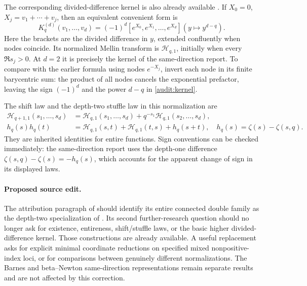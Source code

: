\documentclass[11pt,a4paper]{article}
\numberwithin{equation}{section}
\theoremstyle{plain}
\theoremstyle{definition}
\theoremstyle{remark}
\begin{document}
The corresponding divided-difference kernel is also already available
\cite{INY,HarmonicGaps}.  If $X_0=0$, $X_j=v_1+\cdots+v_j$, then an
equivalent convenient form is
\begin{equation}\label{audit:kernel}
 K_q^{(d)}(v_1,\ldots,v_d)
   =(-1)^d[e^{X_0},e^{X_1},\ldots,e^{X_d}]
                         (y\mapsto y^{d-q}).
\end{equation}
Here the brackets are the divided difference in $y$, extended
confluently when nodes coincide.  Its normalized Mellin transform is
$\mathcal H_{q,1}$, initially when every $\Re s_j>0$.
At $d=2$ it is precisely the kernel of the same-direction report.
To compare with the earlier formula using nodes $e^{-X_j}$, invert
each node in its finite barycentric sum: the product of all nodes
cancels the exponential prefactor, leaving the sign $(-1)^d$ and
the power $d-q$ in \eqref{audit:kernel}.

The shift law and the depth-two stuffle law in this normalization are
\begin{align}
 \mathcal H_{q+1,1}(s_1,\ldots,s_d)
 &=\mathcal H_{q,1}(s_1,\ldots,s_d)
                   +q^{-s_1}\mathcal H_{q,1}(s_2,\ldots,s_d),
                   \label{audit:shift}\\
 h_q(s)h_q(t)
 &=\mathcal H_{q,1}(s,t)+\mathcal H_{q,1}(t,s)+h_q(s+t),
 \quad h_q(s)=\zeta(s)-\zeta(s,q).
 \label{audit:stuffle}
\end{align}
They are inherited identities for entire functions.  Sign conventions
can be checked immediately: the same-direction report uses the
depth-one difference $\zeta(s,q)-\zeta(s)=-h_q(s)$, which accounts
for the apparent change of sign in its displayed laws.

\paragraph{Proposed source edit.}
The attribution paragraph of \cite{SameDirection} should identify its
entire connected double family as the depth-two specialization of
\cite{INY,IndependentOrders}.  Its second further-research question
should no longer ask for existence, entireness, shift/stuffle laws, or
the basic higher divided-difference kernel.  Those constructions are
already available.  A useful replacement asks for explicit minimal
coordinate reductions on specified mixed nonpositive-index loci,
or for comparisons between genuinely different normalizations.
The Barnes and beta--Newton same-direction representations remain
separate results and are not affected by this correction.
\end{document}
